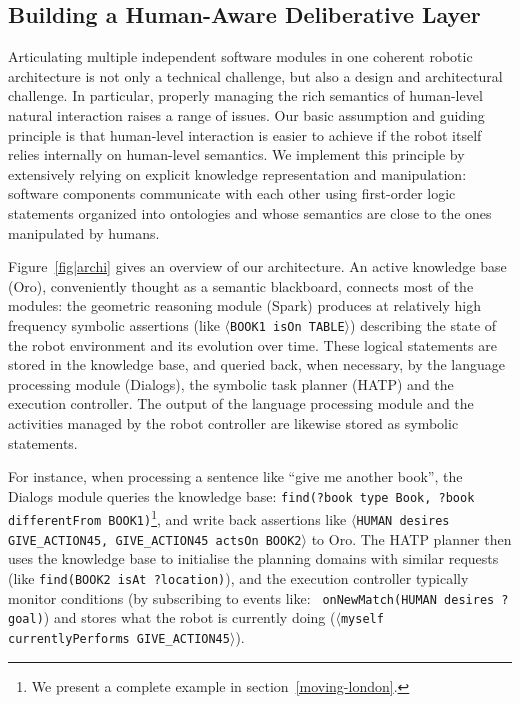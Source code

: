 \documentclass[preprint,3p,times]{elsarticle}
\newcommand{\stmt}[1]{{\footnotesize\tt$\langle$#1\relax$\rangle$}}
\begin{document}
\subsection{Building a Human-Aware Deliberative Layer}

Articulating multiple independent software modules in one coherent robotic
architecture is not only a technical challenge, but also a design and
architectural challenge. In particular, properly managing the rich semantics of
human-level natural interaction raises a range of issues. Our basic assumption
and guiding principle is that human-level interaction is easier to achieve if
the robot itself relies internally on human-level semantics.  We implement this
principle by extensively relying on explicit knowledge representation and
manipulation: software components communicate with each other using first-order
logic statements organized into ontologies and whose semantics are close to the
ones manipulated by humans.

Figure~\ref{fig|archi} gives an overview of our architecture. An active
knowledge base ({\sc Oro}), conveniently thought as a semantic
blackboard, connects most of the modules: the geometric
reasoning module ({\sc Spark}) produces at relatively high frequency symbolic assertions (like
\stmt{BOOK1 isOn TABLE}) describing the state of the robot environment and its evolution over time. 
These logical statements are stored in the knowledge base, and
queried back, when necessary, by the language processing module ({\sc Dialogs}), the symbolic task
planner (HATP) and the execution controller. The output of the language
processing module and the activities managed by the robot controller are
likewise stored as symbolic statements.

For instance, when processing a sentence like ``give me another book'', the {\sc
Dialogs} module queries the knowledge base: {\tt \footnotesize find(?book type
Book, ?book differentFrom BOOK1)}\footnote{We present a complete
example in section~\ref{moving-london}.}, and write back assertions like
\stmt{HUMAN desires GIVE\_ACTION45, GIVE\_ACTION45 actsOn BOOK2} to {\sc
Oro}. The HATP planner then uses the knowledge base to initialise the
planning domains with similar requests (like {\tt \footnotesize find(BOOK2 isAt
?location)}), and the execution controller typically monitor
conditions (by subscribing to events like: {\tt \footnotesize
onNewMatch(HUMAN desires ?goal)}) and stores what the robot is currently
doing (\stmt{myself currentlyPerforms GIVE\_ACTION45}).
\end{document}
